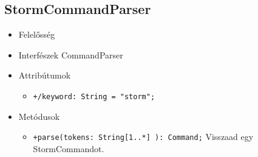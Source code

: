\subsection{StormCommandParser}
\begin{itemize}
\item Felelősség\newline
\item Interfészek\newline
CommandParser
\item Attribútumok
	\begin{itemize}
		\item \texttt{+/keyword: String = "storm";}
	\end{itemize}
\item Metódusok
\begin{itemize}
		\item \texttt{+parse(tokens: String[1..*] ): Command;} \newline
		Visszaad egy StormCommandot.
	\end{itemize}
\end{itemize}

